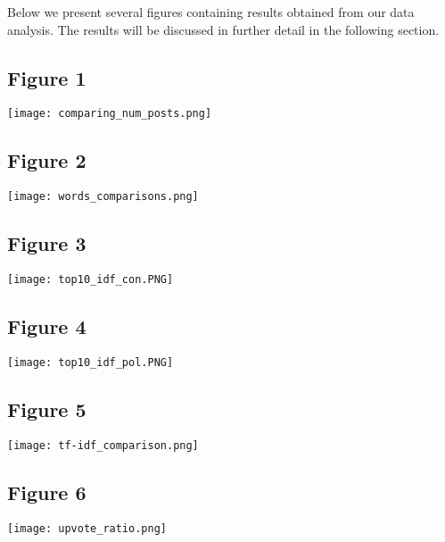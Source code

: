 \documentclass[11pt]{article}
\begin{document}
Below we present several figures containing results obtained from our data analysis. The results will be discussed in further detail in the following section.

\subsection*{Figure 1}
\begin{center}
    \texttt{[image: comparing\_num\_posts.png]}
\end{center}

\subsection*{Figure 2}
\begin{center}
    \texttt{[image: words\_comparisons.png]}
\end{center}

\subsection*{Figure 3}
\begin{center}
    \texttt{[image: top10\_idf\_con.PNG]}
\end{center}

\subsection*{Figure 4}
\begin{center}
    \texttt{[image: top10\_idf\_pol.PNG]}
\end{center}

\subsection*{Figure 5}
\begin{center}
    \texttt{[image: tf-idf\_comparison.png]}
\end{center}

\subsection*{Figure 6}
\begin{center}
    \texttt{[image: upvote\_ratio.png]}
\end{center}

\end{document}
